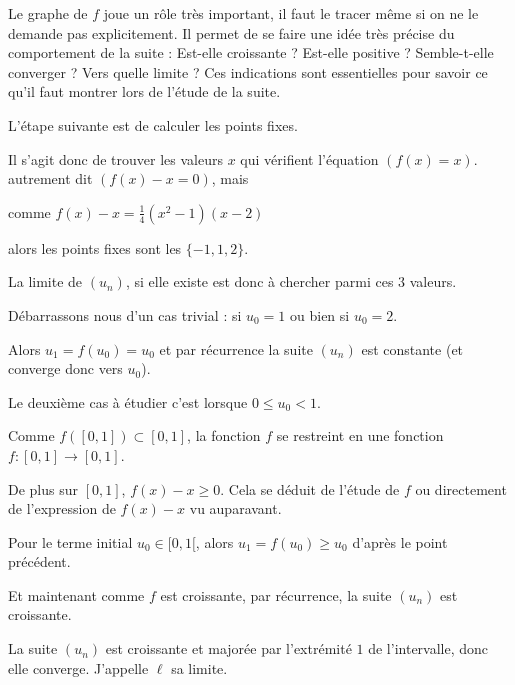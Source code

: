 Le graphe de $f$ joue un rôle très important, il faut le tracer même si on ne le demande pas explicitement. 
Il permet de se faire une idée très précise du comportement de la suite :
Est-elle croissante ? Est-elle positive ? Semble-t-elle converger ? Vers quelle limite ? 
Ces indications sont essentielles pour savoir ce qu'il faut montrer lors de l'étude de la suite.

\diapo


L'étape suivante est de calculer les points fixes.

\change

Il s'agit donc de trouver les valeurs $x$ qui vérifient l'équation $(f(x)=x)$.
autrement dit $(f(x)-x=0)$, mais 

\change

comme $f(x)-x=\frac14 (x^2-1)(x-2)$

\change
alors les points fixes sont les $\{-1,1,2\}$.

\change

La limite de $(u_n)$, si elle existe est donc à chercher parmi ces $3$ valeurs.

\change

Débarrassons nous d'un cas trivial :
si $u_0=1$ ou bien si $u_0=2$.
  
  
\change

  Alors $u_1=f(u_0)=u_0$ et par récurrence la suite $(u_n)$ est constante (et converge 
  donc vers $u_0$).

\diapo

Le deuxième cas à étudier c'est lorsque $0 \le u_0 <1$. 

\change

Comme $f([0,1])\subset [0,1]$, la fonction $f$ se restreint en une fonction
    $f : [0,1] \to [0,1]$.

    \change
    
De plus sur $[0,1]$, $f(x)-x\ge0$. Cela se déduit de l'étude de $f$ ou 
    directement de l'expression de $f(x)-x$ vu auparavant.
    
\change
    
Pour le terme initial $u_0 \in [0,1[$, alors $u_1 = f(u_0) \ge u_0$ d'après le point précédent. 

Et maintenant comme $f$ est croissante, par récurrence, la suite $(u_n)$ est croissante.

\change

La suite $(u_n)$ est croissante et majorée par l'extrémité $1$ de l'intervalle, 
donc elle converge. J'appelle $\ell$ sa limite.
 
